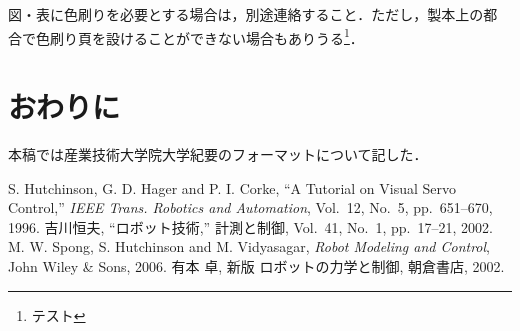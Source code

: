 \documentclass[a4j, 12Q, twocolumn, twoside]{jsarticle}
\begin{document}
図・表に色刷りを必要とする場合は，別途連絡すること．ただし，製本上の都
合で色刷り頁を設けることができない場合もありうる\footnote{テスト}．

\section{おわりに}
本稿では産業技術大学院大学紀要のフォーマットについて記した．

\begin{thebibliography}{99}
S. Hutchinson, G. D. Hager and P. I. Corke,
``A Tutorial on Visual Servo Control,''
{\it IEEE Trans. Robotics and Automation},
Vol.~12, No.~5, pp.~651--670, 1996.
%
吉川恒夫,
``ロボット技術,''
計測と制御, Vol.~41, No.~1, pp.~17--21, 2002.
%
M. W. Spong, S. Hutchinson and M. Vidyasagar, 
{\it Robot Modeling and Control}, 
John Wiley \& Sons, 2006. 
%
有本 卓, 新版 ロボットの力学と制御, 朝倉書店, 2002. 
\end{thebibliography}
\end{document}
